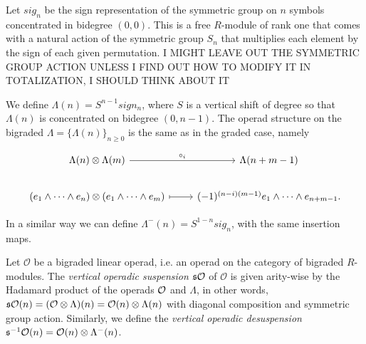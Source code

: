 \documentclass[twoside]{article}
\begin{document}


Let $sig_n$ be the sign representation of the symmetric group on $n$ symbols concentrated in bidegree $(0,0)$. This is a free $R$-module of rank one that comes with a natural action of the symmetric group $S_n$ that multiplies each element by the sign of each given permutation. I MIGHT LEAVE OUT THE SYMMETRIC GROUP  ACTION UNLESS I FIND OUT HOW TO MODIFY IT IN TOTALIZATION, I SHOULD THINK ABOUT IT

We define $\Lambda(n)=S^{n-1}sign_n$, where  $S$ is a vertical shift of degree so that $\Lambda(n)$ is concentrated on bidegree  $(0,n-1)$.
The operad structure on the bigraded $\Lambda=\{\Lambda(n)\}_{n\geq 0}$ is the same as in the graded case, namely

\[
\begin{tikzcd}
\Lambda(n)\otimes\Lambda(m) \arrow[r, "\circ_i"] & \Lambda(n+m-1)\\
(e_1\land\cdots\land e_n)\otimes(e_1\land\cdots\land e_m)\arrow[r, mapsto] & (-1)^{(n-i)(m-1)}e_1\land\cdots\land e_{n+m-1}.
\end{tikzcd}
\]



In a similar way we can define $\Lambda^-(n)=S^{1-n}sig_n$, with the same insertion maps.
\begin{definition}
Let $\mathcal{O}$ be a bigraded linear operad, i.e. an operad on the category of bigraded $R$-modules. The \emph{vertical operadic suspension} $\mathfrak{s}{\mathcal O}$ of $\mathcal{O}$ is given arity-wise by the Hadamard product of the operads ${\mathcal O}$ and $\Lambda$, in other words, $\mathfrak{s}{\mathcal O}(n)=(\mathcal{O}\otimes\Lambda)(n)=\mathcal{O}(n)\otimes\Lambda(n)$ with diagonal composition and symmetric group action. Similarly, we define the \emph{vertical operadic desuspension} $\mathfrak{s}^{-1}{\mathcal O}(n)=\mathcal{O}(n)\otimes\Lambda^-(n)$. %
\end{definition}
\end{document}
